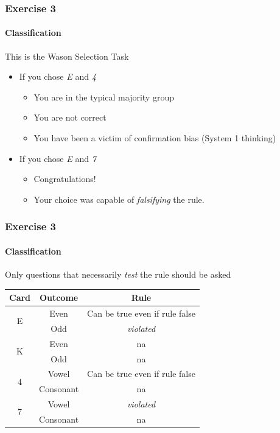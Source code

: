 \documentclass[table]{beamer}
\begin{document}
  \begin{frame}
    \frametitle{Exercise 3}
    \framesubtitle{Classification}
    This is the Wason Selection Task
    \begin{itemize}
      \item<1-> If you chose \emph{E} and \emph{4}
      \begin{itemize}
        \item<2-> You are in the typical majority group
        \item<2-> You are not correct
        \item<2-> You have been a victim of confirmation bias (System 1 thinking)
      \end{itemize}
      \item<3-> If you chose \emph{E} and \emph{7}
      \begin{itemize}
        \item<4-> Congratulations!
        \item<4-> Your choice was capable of \textit{falsifying} the rule.
      \end{itemize}
    \end{itemize}
  \end{frame}

  \begin{frame}
    \frametitle{Exercise 3}
    \framesubtitle{Classification}
    Only questions that necessarily \emph{test} the rule should be asked
    \begin{center}
	\begin{tabular}{c|c|c}
	  Card & Outcome & Rule \\
	  \hline
	  \hline
	    \multirow{2}{*}{E} & Even & Can be true even if rule false \\
	                                & Odd & \emph{violated} \\
	  \hline
	    \multirow{2}{*}{K} & Even & na \\
	                                & Odd & na \\	    
	  \hline
	    \multirow{2}{*}{4} & Vowel & Can be true even if rule false \\
	                                & Consonant & na \\
	  \hline
	    \multirow{2}{*}{7} & Vowel & \emph{violated} \\
	                                & Consonant & na \\	    
	\end{tabular}
    \end{center}
  \end{frame}
\end{document}
